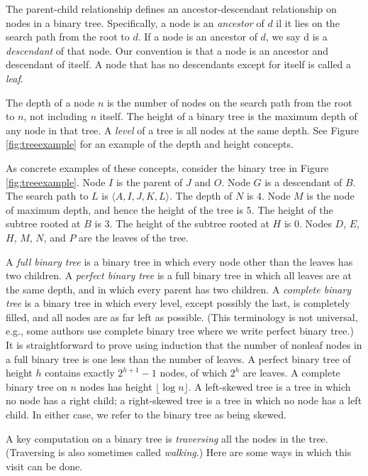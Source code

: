 \documentclass[11pt,a4paper]{article}
\begin{document}
The parent-child relationship defines an ancestor-descendant relationship on
nodes in a binary tree. Specifically, a node is an \textit{ancestor} of $d$ il
it lies on the search path from the root to $d$. If a node is an ancestor of
$d$, we say d is a \textit{descendant} of that node. Our convention is that a
node is an ancestor and descendant of itself. A node that has no descendants
except for itself is called a \textit{leaf}.

The depth of a node $n$ is the number of nodes on the search path from the root
to $n$, not including $n$ itself. The height of a binary tree is the maximum
depth of any node in that tree. A \textit{level} of a tree is all nodes at the
same depth. See Figure \ref{fig:treeexample} for an example of the depth and
height concepts.

As concrete examples of these concepts, consider the binary tree in Figure
\ref{fig:treeexample}. Node $I$ is the parent of $J$ and $O$. Node $G$ is a
descendant of $B$. The search path to $L$ is $\langle A,I,J,K,L\rangle$. The
depth of $N$ is $4$. Node $M$ is the node of maximum depth, and hence the height
of the tree is $5$. The height of the subtree rooted at $B$ is $3$. The height
of the subtree rooted at $H$ is $0$. Nodes $D$, $E$, $H$, $M$, $N$, and $P$ are
the leaves of the tree.

A \textit{full binary tree} is a binary tree in which every node other than the
leaves has two children. A \textit{perfect binary tree} is a full binary tree in
which all leaves are at the same depth, and in which every parent has two
children. A \textit{complete binary tree} is a binary tree in which every level,
except possibly the last, is completely filled, and all nodes are as far left as
possible. (This terminology is not universal, e.g., some authors use complete
binary tree where we write perfect binary tree.) It is straightforward to prove
using induction that the number of nonleaf nodes in a full binary tree is one
less than the number of leaves. A perfect binary tree of height $h$ contains
exactly $2^{h+1} - 1$ nodes, of which $2^h$ are leaves. A complete binary tree
on $n$ nodes has height $\lfloor\log n\rfloor$. A left-skewed tree is a tree in
which no node has a right child; a right-skewed tree is a tree in which no node
has a left child. In either case, we refer to the binary tree as being skewed.

A key computation on a binary tree is \textit{traversing} all the nodes in the
tree. (Traversing is also sometimes called \textit{walking}.) Here are some ways
in which this visit can be done.
\end{document}
